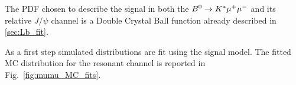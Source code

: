 The PDF chosen to describe the signal in both the ${{B}^0} \rightarrow{\ensuremath{{K}^*}}{\ensuremath{\mu^+\mu^-}}$ and its relative $J/\psi$ channel 
is a Double Crystal Ball function already described in \ref{sec:Lb_fit}.







As a first step simulated distributions are fit using the signal model.
The fitted MC distribution for the resonant channel is reported in Fig.~\ref{fig:mumu_MC_fits}.

